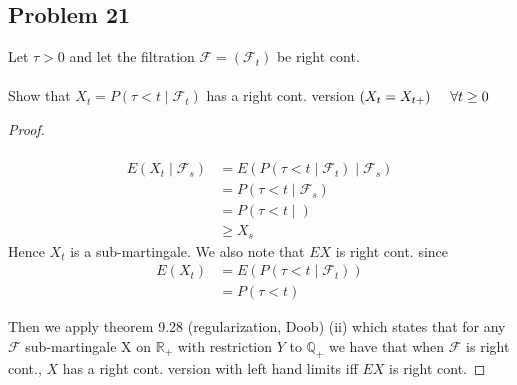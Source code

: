 \documentclass[11pt]{article}
\begin{document}
\subsection*{Problem 21}
Let $\tau > 0$ and let the filtration $\mathcal{F}=(\mathcal{F}_t)$ be right cont. \\ \\
Show that $X_t = P(\tau < t \mid \mathcal{F}_t)$ has a right cont. version $(X_t = X_{t+}) \hspace{0.5cm} \forall t \geq 0$
\begin{proof}\\ \\
	\begin{align*}
		E(X_t \mid \mathcal{F}_s) &= E(P(\tau < t \mid \mathcal{F}_t ) \mid \mathcal{F}_s) \\
		&=P(\tau < t \mid \mathcal{F}_s) \\
		&=P(\tau < t \mid ) \\
		&\geq X_s
	\end{align*}
	Hence $X_t$ is a sub-martingale. We also note that $EX$ is right cont. since 
	\begin{align*}
		E(X_t) &= E(P(\tau < t \mid \mathcal{F}_t)) \\
		&= P(\tau < t) 
	\end{align*}

	Then we apply theorem 9.28 (regularization, Doob) (ii) which states that for any $\mathcal{F}$ sub-martingale X on $\mathbb{R}_+$ with restriction $Y$ to $\mathbb{Q}_+$ we have 
	that when $\mathcal{F}$ is right cont., $X$ has a right cont. version with left hand limits iff $EX$ is right cont. 
\end{proof}
\end{document}
